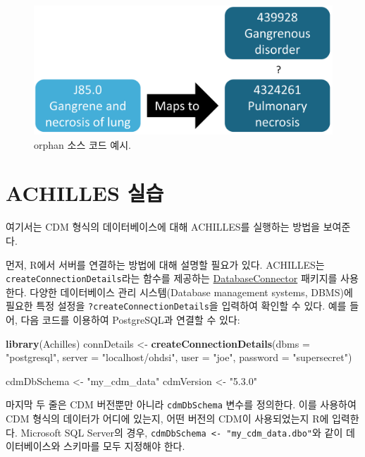 \documentclass[10.5pt]{book}
\newenvironment{Shaded}{\begin{snugshade}}{\end{snugshade}}
\newcommand{\KeywordTok}[1]{\textcolor[rgb]{0.13,0.29,0.53}{\textbf{#1}}}
\newcommand{\DataTypeTok}[1]{\textcolor[rgb]{0.13,0.29,0.53}{#1}}
\newcommand{\StringTok}[1]{\textcolor[rgb]{0.31,0.60,0.02}{#1}}
\newcommand{\NormalTok}[1]{#1}
\theoremstyle{definition}
\theoremstyle{definition}
\theoremstyle{definition}
\theoremstyle{remark}
\begin{document}
\begin{figure}

{\centering \includegraphics[width=0.7\linewidth]{images/DataQuality/missingMapping} 

}

\caption{orphan 소스 코드 예시. }\label{fig:missingMapping}
\end{figure}

\section{ACHILLES 실습}\label{achillesInPractice}

여기서는 CDM 형식의 데이터베이스에 대해 ACHILLES를 실행하는 방법을
보여준다.

먼저, R에서 서버를 연결하는 방법에 대해 설명할 필요가 있다. ACHILLES는
\texttt{createConnectionDetails}라는 함수를 제공하는
\href{https://ohdsi.github.io/DatabaseConnector/}{DatabaseConnector}
패키지를 사용한다. 다양한 데이터베이스 관리 시스템(Database management
systems, DBMS)에 필요한 특정 설정을 \texttt{?createConnectionDetails}을
입력하여 확인할 수 있다. 예를 들어, 다음 코드를 이용하여 PostgreSQL과
연결할 수 있다:

\begin{Shaded}
\begin{Highlighting}[]
\KeywordTok{library}\NormalTok{(Achilles)}
\NormalTok{connDetails <-}\StringTok{ }\KeywordTok{createConnectionDetails}\NormalTok{(}\DataTypeTok{dbms =} \StringTok{"postgresql"}\NormalTok{,}
                                       \DataTypeTok{server =} \StringTok{"localhost/ohdsi"}\NormalTok{,}
                                       \DataTypeTok{user =} \StringTok{"joe"}\NormalTok{,}
                                       \DataTypeTok{password =} \StringTok{"supersecret"}\NormalTok{)}

\NormalTok{cdmDbSchema <-}\StringTok{ "my_cdm_data"}
\NormalTok{cdmVersion <-}\StringTok{ "5.3.0"}
\end{Highlighting}
\end{Shaded}

마지막 두 줄은 CDM 버전뿐만 아니라 \texttt{cdmDbSchema} 변수를 정의한다.
이를 사용하여 CDM 형식의 데이터가 어디에 있는지, 어떤 버전의 CDM이
사용되었는지 R에 입력한다. Microsoft SQL Server의 경우,
\texttt{cdmDbSchema\ \textless{}-\ "my\_cdm\_data.dbo"}와 같이
데이터베이스와 스키마를 모두 지정해야 한다.
\end{document}
